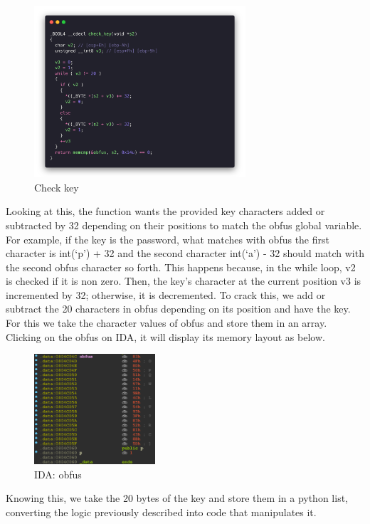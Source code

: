 \begin{figure}[H]
  \centering
  \includegraphics[width=0.7\textwidth]{figures/check-key}
  \caption{Check key}
  \label{f:check-key}
\end{figure}

Looking at this, the function wants the provided key characters added or
subtracted by 32 depending on their positions to match the obfus global variable.
For example, if the key is the password, what matches with obfus the first
character is int(`p') + 32 and the second character int(`a') - 32 should match
with the second obfus character so forth. This happens because, in the while
loop, v2 is checked if it is non zero. Then, the key's character at the current
position v3 is incremented by 32; otherwise, it is decremented. To crack this,
we add or subtract the 20 characters in obfus depending on its position and have
the key. For this we take the character values of obfus and store them in an
array. Clicking on the obfus on IDA, it will display its memory layout as below.

\begin{figure}[H]
  \centering
  \includegraphics[width=0.4\textwidth]{figures/obfus}
  \caption{IDA: obfus}
  \label{f:obfus}
\end{figure}

Knowing this, we take the 20 bytes of the key and store them in a python list,
converting the logic previously described into code that manipulates it.

